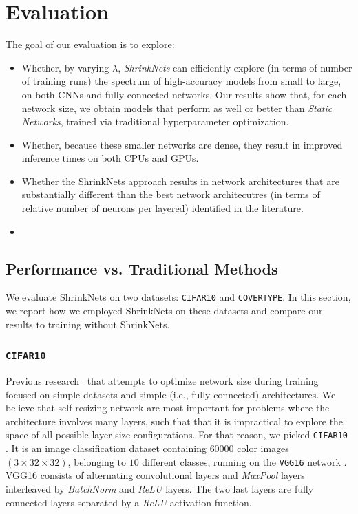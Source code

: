 \section{Evaluation}

The goal of our evaluation is to explore:
\begin{itemize}
	\item
Whether, by varying $\lambda$, \textit{ShrinkNets} can efficiently explore (in terms of number of training runs)  the spectrum of high-accuracy models from small to large, on both CNNs and fully connected networks.  Our results show that, for each network size, we obtain models that perform as well or better than 
\textit{Static Networks}, trained via traditional hyperparameter optimization.

\item Whether, because these  smaller networks are dense, they result in improved inference times on both CPUs and GPUs.

\item Whether the ShrinkNets approach results in network architectures that are substantially different than the best network architecutres (in terms of relative number of neurons per layered) identified in the literature.

\item {}
\end{itemize}


\subsection{Performance vs. Traditional Methods}

We evaluate ShrinkNets on two datasets:  \texttt{CIFAR10} and \texttt{COVERTYPE}.  In this section, we report how we employed ShrinkNets on these datasets and compare our results to 
training without ShrinkNets.

\subsubsection{\texttt{CIFAR10}}

Previous research~\cite{Scardapane2017} that attempts to optimize network size during training
 focused on simple datasets and simple (i.e., fully connected)
architectures. We believe that self-resizing
network are most important for problems where the architecture 
involves many layers, such that that it is impractical to explore the space of all possible
layer-size configurations. For that reason, we picked \texttt{CIFAR10} \cite{Krizhevsky2009}. It is an
image classification dataset containing $60000$ color images $(3 \times 32
\times 32)$, belonging to $10$ different classes, running on  the \texttt{VGG16} network \cite{Srivastava2014}. VGG16
consists of alternating convolutional layers and \textit{MaxPool} layers
interleaved by \textit{BatchNorm} \cite{DBLP:journals/corr/IoffeS15} and
\textit{ReLU} \cite{Nair2010}  layers. The two last layers are fully connected
layers separated by a \textit{ReLU} activation function.

